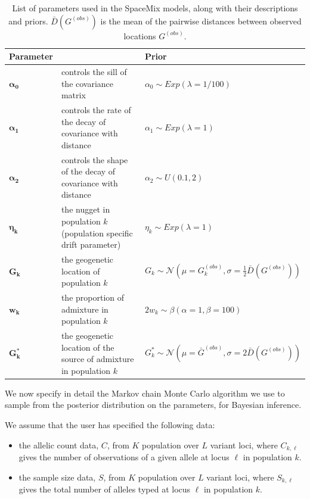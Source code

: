 \documentclass[10pt,letterpaper]{article}
\newcommand{\identifyadmixsource}[1]{{#1^{*}}}
\begin{document}
\begin{centering}
\begin{table}
\begin{tabular}{| >{\centering\arraybackslash}m{2.0cm} | m{5.2cm} | >{\centering\arraybackslash}m{6.8cm} |}
	\hline
	\textbf{Parameter} & \centering{\textbf{Description}} & \textbf{Prior}\\ \hline
	$\boldsymbol{\alpha_0}$ & 
		controls the sill of the covariance matrix & 
		$\alpha_0 \sim Exp(\lambda = 1/100)$\\ \hline
	$\boldsymbol{\alpha_1}$ & 
		controls the rate of the decay of covariance with distance & 
		$\alpha_1 \sim Exp(\lambda = 1)$\\ \hline
	$\boldsymbol{\alpha_2}$ & 
		controls the shape of the decay of covariance with distance & 
		$\alpha_2 \sim U(0.1,2)$\\ \hline
	$\boldsymbol{\eta_k}$ & 
		the nugget in population $k$ (population specific drift parameter)  & 
		$\eta_k \sim Exp(\lambda = 1)$\\ \hline
	$\boldsymbol{G_k}$ & 
		the geogenetic location of population $k$ &
		 $G_k \sim \mathcal{N}(\mu = G^{(obs)}_k,\sigma = \frac{1}{2}\bar{D}(G^{(obs)}))$ \\ \hline
	$\boldsymbol{w_k}$ &
		the proportion of admixture in population $k$ &
		$2 w_k \sim \beta(\alpha = 1,\beta = 100)$  \\ \hline
	$\boldsymbol{\identifyadmixsource{G_k}}$ &
		the geogenetic location of the source of admixture in population $k$ &
		$\identifyadmixsource{G_k} \sim \mathcal{N}(\mu = \bar{G}^{(obs)},\sigma = 2 \bar{D}(G^{(obs)}))$ \\
	\hline
\end{tabular}
\caption{
List of parameters used in the SpaceMix models, along with their descriptions and priors.
$\bar{D}(G^{(obs)})$ is the mean of the pairwise distances between observed locations $G^{(obs)}$.
}\label{tab:param_prior_tab}
\end{table}
\end{centering}

We now specify in detail the Markov chain Monte Carlo algorithm we use to sample from the posterior distribution on the parameters,
for Bayesian inference.

We assume that the user has specified the following data: 
\begin{itemize}
\item the allelic count data, $C$, from $K$ population over $L$ variant loci, where $C_{k,\ell}$ gives the number of observations of a given allele at locus $\ell$ in population $k$. 
\item the sample size data, $S$, from $K$ population over $L$ variant loci, where $S_{k,\ell}$ gives the total number of alleles typed at locus $\ell$ in population $k$.
\end{itemize}
\end{document}
